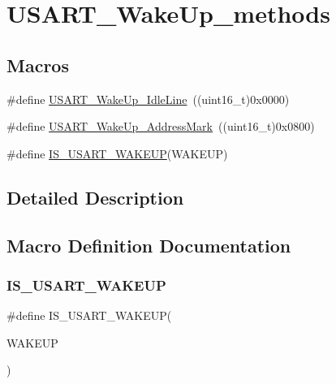 \hypertarget{group___u_s_a_r_t___wake_up__methods}{}\section{U\+S\+A\+R\+T\+\_\+\+Wake\+Up\+\_\+methods}
\label{group___u_s_a_r_t___wake_up__methods}
\subsection*{Macros}
\begin{DoxyCompactItemize}
\item 
\#define \mbox{\hyperlink{group___u_s_a_r_t___wake_up__methods_ga9646d71590d5cef29ee12da0bb431d92}{U\+S\+A\+R\+T\+\_\+\+Wake\+Up\+\_\+\+Idle\+Line}}~((uint16\+\_\+t)0x0000)
\item 
\#define \mbox{\hyperlink{group___u_s_a_r_t___wake_up__methods_ga9f63c1671060682adee91b9a2f3202e4}{U\+S\+A\+R\+T\+\_\+\+Wake\+Up\+\_\+\+Address\+Mark}}~((uint16\+\_\+t)0x0800)
\item 
\#define \mbox{\hyperlink{group___u_s_a_r_t___wake_up__methods_ga3611be417bdb82f42dc2ca17584271f9}{I\+S\+\_\+\+U\+S\+A\+R\+T\+\_\+\+W\+A\+K\+E\+UP}}(W\+A\+K\+E\+UP)
\end{DoxyCompactItemize}


\subsection{Detailed Description}


\subsection{Macro Definition Documentation}
\mbox{\label{group___u_s_a_r_t___wake_up__methods_ga3611be417bdb82f42dc2ca17584271f9}} 
\subsubsection{\texorpdfstring{IS\_USART\_WAKEUP}{IS\_USART\_WAKEUP}}
{\footnotesize\ttfamily \#define I\+S\+\_\+\+U\+S\+A\+R\+T\+\_\+\+W\+A\+K\+E\+UP(\begin{DoxyParamCaption}\item[{}]{W\+A\+K\+E\+UP }\end{DoxyParamCaption})}

